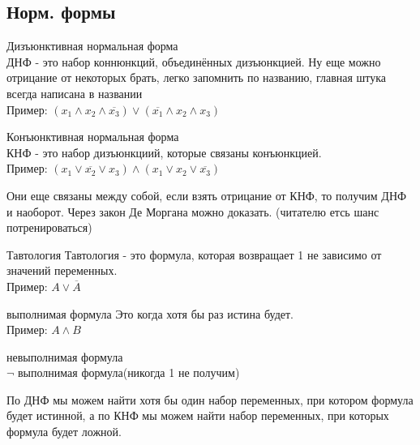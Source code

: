 \subsection{Норм. формы}
\begin{definition}{Дизъюнктивная нормальная форма} 
  \\
  ДНФ - это набор коннюнкций, объединённых дизъюнкцией. Ну еще можно отрицание от некоторых брать, легко запомнить по названию, главная штука всегда написана в названии \\
  Пример: $(x_1 \land x_2 \land \overline{x_3}) \lor (\overline{x_1} \land x_2 \land x_3)$
\end{definition}
\begin{definition}
  {Конъюнктивная нормальная форма} \\
  КНФ - это набор дизъюнкциий, которые связаны конъюнкцией. \\
  Пример: $(x_1 \lor \overline{x_2} \lor x_3) \land (x_1 \lor x_2 \lor \overline{x_3})$
\end{definition}
Они еще связаны между собой, если взять отрицание от КНФ, то получим ДНФ и наоборот. Через закон Де Моргана можно доказать. (читателю етсь шанс потренироваться)
\begin{definition}{Тавтология}
Тавтология - это формула, которая возвращает 1 не зависимо от значений переменных.\\
Пример: $A \lor \overline{A}$ \\
\end{definition}
\begin{definition}{выполнимая формула}
Это когда хотя бы раз истина будет. \\
Пример: $A \land B$ \\
\end{definition}
\begin{definition}{невыполнимая формула}
\\
$\neg$ выполнимая формула(никогда 1 не получим)
\end{definition}
По ДНФ мы можем найти хотя бы один набор переменных, при котором формула будет истинной, а по КНФ мы можем найти набор переменных, при которых формула будет ложной. \\

